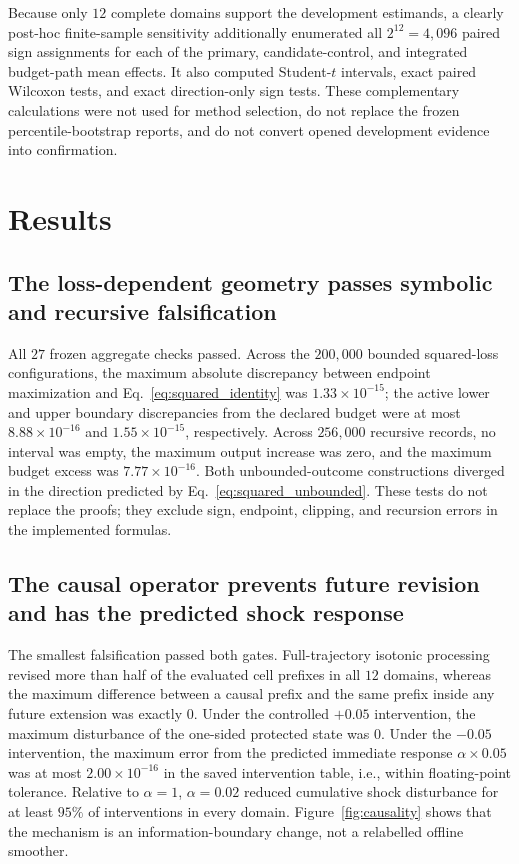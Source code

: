 \documentclass[11pt]{article}
\begin{document}
Because only $12$ complete domains support the development estimands, a clearly post-hoc finite-sample sensitivity additionally enumerated all $2^{12}=4{,}096$ paired sign assignments for each of the primary, candidate-control, and integrated budget-path mean effects. It also computed Student-$t$ intervals, exact paired Wilcoxon tests, and exact direction-only sign tests. These complementary calculations were not used for method selection, do not replace the frozen percentile-bootstrap reports, and do not convert opened development evidence into confirmation.

\section{Results}

\subsection{The loss-dependent geometry passes symbolic and recursive falsification}

All $27$ frozen aggregate checks passed. Across the $200{,}000$ bounded squared-loss configurations, the maximum absolute discrepancy between endpoint maximization and Eq.~\eqref{eq:squared_identity} was $1.33\times10^{-15}$; the active lower and upper boundary discrepancies from the declared budget were at most $8.88\times10^{-16}$ and $1.55\times10^{-15}$, respectively. Across $256{,}000$ recursive records, no interval was empty, the maximum output increase was zero, and the maximum budget excess was $7.77\times10^{-16}$. Both unbounded-outcome constructions diverged in the direction predicted by Eq.~\eqref{eq:squared_unbounded}. These tests do not replace the proofs; they exclude sign, endpoint, clipping, and recursion errors in the implemented formulas.

\subsection{The causal operator prevents future revision and has the predicted shock response}

The smallest falsification passed both gates. Full-trajectory isotonic processing revised more than half of the evaluated cell prefixes in all $12$ domains, whereas the maximum difference between a causal prefix and the same prefix inside any future extension was exactly $0$. Under the controlled $+0.05$ intervention, the maximum disturbance of the one-sided protected state was $0$. Under the $-0.05$ intervention, the maximum error from the predicted immediate response $\alpha\times0.05$ was at most $2.00\times10^{-16}$ in the saved intervention table, i.e., within floating-point tolerance. Relative to $\alpha=1$, $\alpha=0.02$ reduced cumulative shock disturbance for at least $95\%$ of interventions in every domain. Figure~\ref{fig:causality} shows that the mechanism is an information-boundary change, not a relabelled offline smoother.
\end{document}
